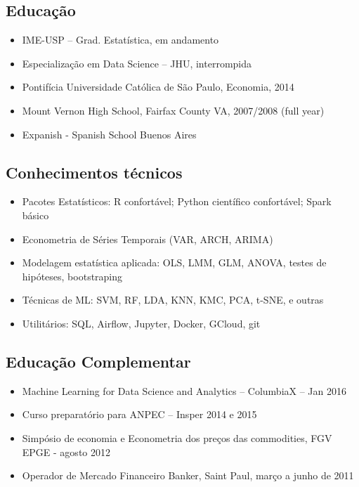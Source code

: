 \documentclass{article}
\begin{document}
\setlength\multicolsep{0pt}

\begin{multicols}{2}
\normalsize

\subsection{Educação}
\begin{itemize}
\item{IME-USP – Grad. Estatística, em andamento} 
\item{Especialização em Data Science – JHU, interrompida} 
\item{Pontifícia Universidade Católica de São Paulo, Economia, 2014}
\item{Mount Vernon High School, Fairfax County VA, 2007/2008 (full year)}
\item{Expanish - Spanish School Buenos Aires}
\end{itemize}


\subsection{Conhecimentos técnicos}
\begin{itemize}
\item{Pacotes Estatísticos: R confortável; Python científico confortável; Spark básico} 
\item{Econometria de Séries Temporais (VAR, ARCH, ARIMA)} 
\item{Modelagem estatística aplicada: OLS, LMM, GLM, ANOVA, testes de hipóteses, bootstraping}
\item{Técnicas de ML: SVM, RF, LDA, KNN, KMC, PCA, t-SNE, e outras}
\item{Utilitários: SQL, Airflow, Jupyter, Docker, GCloud, git}
\end{itemize}


\subsection{Educação Complementar}
\begin{itemize}
\item{Machine Learning for Data Science and Analytics – ColumbiaX – Jan 2016} 
\item{Curso preparatório para ANPEC – Insper 2014 e 2015} 
\item{Simpósio de economia e Econometria dos preços das commodities, FGV EPGE - agosto 2012} 
\item{Operador de Mercado Financeiro Banker, Saint Paul, março a junho de 2011}
\end{itemize}


\end{multicols}
\end{document}
